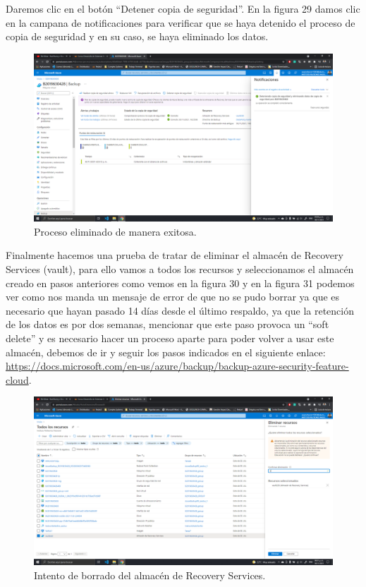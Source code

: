 \documentclass[11pt]{article}
\begin{document}
		 Daremos clic en el botón ``Detener copia de seguridad''. En la figura 29 damos clic en la campana de notificaciones para verificar que se haya detenido el proceso de copia de seguridad y en su caso, se haya eliminado los datos.
		 \begin{figure}[H]
			\centering
			\includegraphics[scale=0.34]{resources/4.7-8.png}
			\caption{Proceso eliminado de manera exitosa.}\label{fig:picture}
		\end{figure}
		Finalmente hacemos una prueba de tratar de eliminar el almacén de Recovery Services (vault), para ello vamos a todos los recursos y seleccionamos el almacén creado en pasos anteriores como vemos en la figura 30 y en la figura 31 podemos ver como nos manda un mensaje de error de que no se pudo borrar ya que es necesario que hayan pasado 14 días desde el último respaldo, ya que la retención de los datos es por dos semanas, mencionar que este paso provoca un ``soft delete'' y es necesario hacer un proceso aparte para poder volver a usar este almacén, debemos de ir y seguir los pasos indicados en el siguiente enlace: \url{https://docs.microsoft.com/en-us/azure/backup/backup-azure-security-feature-cloud}.
		\begin{figure}[H]
			\centering
			\includegraphics[scale=0.34]{resources/4.9.png}
			\caption{Intento de borrado del almacén de Recovery Services.}\label{fig:picture}
		\end{figure}
\end{document}
